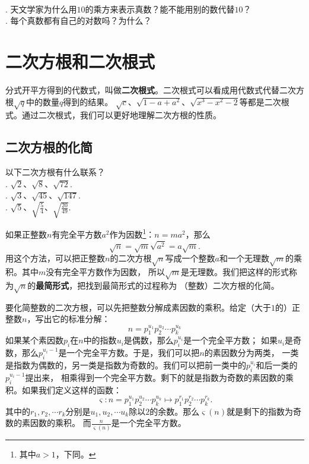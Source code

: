 \documentclass[12pt,UTF8]{ctexbook}
\begin{document}
\clearpage

\begin{sk}
    \mbox{}\\
    . 天文学家为什么用$10$的乘方来表示真数？能不能用别的数代替$10$？\\
    . 每个真数都有自己的对数吗？为什么？
\end{sk}

\chapter{二次方根和二次根式}
分式开平方得到的代数式，叫做\textbf{二次根式}。二次根式可以看成用代数式代替二次方根$\sqrt{q}$中的数量$q$得到的结果。
$\sqrt{c}$、$\sqrt{1 - a + a^2}$、$\sqrt{x^3 - x^2 - 2}$等都是二次根式。通过二次根式，我们可以更好地理解二次方根的性质。

\section{二次方根的化简}
\begin{sk}\label{sk:3-0-0}
    以下二次方根有什么联系？\\
    . $\sqrt{2}$、$\sqrt{8}$、$\sqrt{72}$.\\
    . $\sqrt{3}$、$\sqrt{45}$、$\sqrt{147}$.\\
    . $\sqrt{5}$、$\sqrt{\frac{5}{4}}$、$\sqrt{\frac{20}{49}}$.
\end{sk}
如果正整数$n$有完全平方数$a^2$作为因数\footnote{其中$a>1$，下同。}：$n = ma^2$，那么
$$\sqrt{n} = \sqrt{m}\sqrt{a^2} = a\sqrt{m}.$$
用这个方法，可以把正整数$n$的二次方根$\sqrt{n}$写成一个整数$a$和一个无理数$\sqrt{m}$的乘积。其中$m$没有完全平方数作为因数，
所以$\sqrt{m}$是无理数。我们把这样的形式称为$\sqrt{n}$的\textbf{最简形式}，把找到最简形式的过程称为
（整数）二次方根的化简。

要化简整数的二次方根，可以先把整数分解成素因数的乘积。给定（大于$1$的）正整数$n$，写出它的标准分解：
$$n = p_1^{u_1} p_2^{u_2} \cdots p_k^{u_k}$$
如果某个素因数$p_i$在$n$中的指数$u_i$是偶数，那么$p_i^{u_i}$是一个完全平方数；
如果$u_i$是奇数，那么$p_i^{u_i-1}$是一个完全平方数。于是，我们可以把$n$的素因数分为两类，
一类是指数为偶数的，另一类是指数为奇数的。我们可以把前一类中的$p_i^{u_i}$和后一类的$p_i^{u_i-1}$提出来，
相乘得到一个完全平方数。剩下的就是指数为奇数的素因数的乘积。如果我们定义这样的函数：
$$ \varsigma: n = p_1^{u_1} p_2^{u_2} \cdots p_k^{u_k} \mapsto p_1^{r_1} p_2^{r_2} \cdots p_k^{r_k}. $$
其中的$r_1, r_2, \cdots r_k$分别是$u_1, u_2, \cdots u_k$除以$2$的余数。那么$\varsigma(n)$就是剩下的指数为奇数的素因数的乘积。
而$\frac{n}{\varsigma(n)}$是一个完全平方数。
\end{document}
